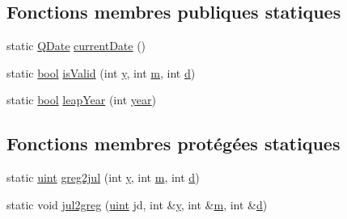 \subsection*{Fonctions membres publiques statiques}
\begin{DoxyCompactItemize}
\item 
static \hyperlink{class_q_date}{Q\+Date} \hyperlink{class_q_date_a7112e1452f46e40cf349f2e769887e1c}{current\+Date} ()
\item 
static \hyperlink{qglobal_8h_a1062901a7428fdd9c7f180f5e01ea056}{bool} \hyperlink{class_q_date_a837d8f55470c8d8fe41efe980b68ee86}{is\+Valid} (int \hyperlink{058__bracket__recursion_8tcl_a2fb1c5cf58867b5bbc9a1b145a86f3a0}{y}, int \hyperlink{060__command__switch_8tcl_a78d127e8bda64d4471ac811ad512fbd9}{m}, int \hyperlink{060__command__switch_8tcl_af43f4b1f0064a33b2d662af9f06d3a00}{d})
\item 
static \hyperlink{qglobal_8h_a1062901a7428fdd9c7f180f5e01ea056}{bool} \hyperlink{class_q_date_a77612a09d0fd5eb1ba99952cef5e9eaa}{leap\+Year} (int \hyperlink{class_q_date_a88d2a135c6094f3e67cd1d125931dda5}{year})
\end{DoxyCompactItemize}
\subsection*{Fonctions membres protégées statiques}
\begin{DoxyCompactItemize}
\item 
static \hyperlink{qglobal_8h_a4d3943ddea65db7163a58e6c7e8df95a}{uint} \hyperlink{class_q_date_a04d5e854090cbd10ab4d8771877e5364}{greg2jul} (int \hyperlink{058__bracket__recursion_8tcl_a2fb1c5cf58867b5bbc9a1b145a86f3a0}{y}, int \hyperlink{060__command__switch_8tcl_a78d127e8bda64d4471ac811ad512fbd9}{m}, int \hyperlink{060__command__switch_8tcl_af43f4b1f0064a33b2d662af9f06d3a00}{d})
\item 
static void \hyperlink{class_q_date_a0e0d4e48f69f7da1bd5e6e8278acb14c}{jul2greg} (\hyperlink{qglobal_8h_a4d3943ddea65db7163a58e6c7e8df95a}{uint} jd, int \&\hyperlink{058__bracket__recursion_8tcl_a2fb1c5cf58867b5bbc9a1b145a86f3a0}{y}, int \&\hyperlink{060__command__switch_8tcl_a78d127e8bda64d4471ac811ad512fbd9}{m}, int \&\hyperlink{060__command__switch_8tcl_af43f4b1f0064a33b2d662af9f06d3a00}{d})
\end{DoxyCompactItemize}
